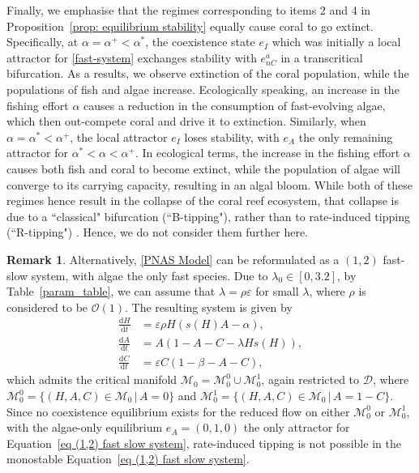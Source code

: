 \documentclass{article}
\theoremstyle{definition}
\numberwithin{equation}{section}
\newtheorem{remark}[prop]{Remark}
\newcommand{\dd}{\mathrm{d}}
\begin{document}
Finally, we emphasise that the regimes corresponding to items 2 and 4 in Proposition~\ref{prop: equilibrium stability} equally cause coral to go extinct. Specifically, at $\alpha=\alpha^+<\alpha^\ast$, the coexistence state $e_I$ which was initially a local attractor for \eqref{fast-system} exchanges stability with $e_{nC}^a$ in a transcritical bifurcation. As a results, we observe extinction of the coral population, while the populations of fish and algae increase. Ecologically speaking, an increase in the fishing effort $\alpha$ causes a reduction in the consumption of fast-evolving algae, which then out-compete coral and drive it to extinction. Similarly, when $\alpha=\alpha^\ast<\alpha^+$, the local attractor $e_I$ loses stability, with $e_A$  the only remaining attractor for $\alpha^\ast<\alpha<\alpha^+$. In ecological terms, the increase in the fishing effort $\alpha$ causes both fish and coral to become extinct, while the population of algae will converge to its carrying capacity, resulting in an algal bloom. While both of these regimes hence result in the collapse of the coral reef ecosystem, that collapse is due to a ``classical" bifurcation (``B-tipping"), rather than to rate-induced tipping (``R-tipping") \cite{ashwin_2012_tipping}. Hence, we do not consider them further here.

\begin{remark}
  Alternatively, \eqref{PNAS Model} can be reformulated as a $(1,2)$ fast-slow system, with algae the only fast species. Due to $\lambda_0\in[0, 3.2]$, by Table~\ref{param_table}, we can assume that $\lambda=\rho \varepsilon$ for small $\lambda$, where $\rho$ is considered to be $\mathcal{O}(1)$. The resulting system is given by 
    \begin{equation}
        \begin{aligned}
            \frac{\dd H}{\dd t} &=  \varepsilon \rho H(s(H) A - \alpha), \\
    \frac{\dd A}{\dd t} &= A(1-A-C-\lambda H s(H)), \\
    \frac{\dd C}{\dd t} &= \varepsilon C(1-\beta-A-C), 
    \label{eq (1,2) fast slow system}
        \end{aligned}
    \end{equation}
   which admits the critical manifold $\mathcal{M}_0=\mathcal{M}_{0}^0\cup \mathcal{M}_{0}^1$, again restricted to $\mathcal{D}$, where $\mathcal{M}_{0}^0=\{(H,A,C)\in \mathcal{M}_0\,|\, A=0\}$ and $\mathcal{M}_{0}^1=\{(H,A,C)\in \mathcal{M}_0\,|\, A=1-C\}$. Since no coexistence equilibrium exists for the reduced flow on either $\mathcal{M}_0^0$ or $\mathcal{M}_0^1$, with the algae-only equilibrium $e_A=(0,1,0)$ the only attractor for Equation~\eqref{eq (1,2) fast slow system}, rate-induced tipping is not possible in the monostable Equation~\eqref{eq (1,2) fast slow system}. 
\end{remark}
\end{document}
